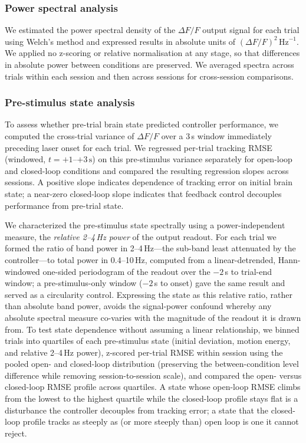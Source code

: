 \subsubsection*{Power spectral analysis}

We estimated the power spectral density of the $\Delta F/F$ output
signal for each trial using Welch's method and expressed results in
absolute units of $(\Delta F/F)^{2}\,\text{Hz}^{-1}$. We applied no
z-scoring or relative normalisation at any stage, so that differences in
absolute power between conditions are preserved. We averaged spectra
across trials within each session and then across sessions for
cross-session comparisons.

\subsubsection*{Pre-stimulus state analysis}
\label{sec:disturbance}

To assess whether pre-trial brain state predicted controller performance,
we computed the cross-trial variance of $\Delta F/F$ over a 3\,s window
immediately preceding laser onset for each trial. We regressed per-trial
tracking RMSE (windowed, $t = +1$--$+3\,\text{s}$) on this pre-stimulus
variance separately for open-loop and closed-loop conditions and compared
the resulting regression slopes across sessions. A positive slope
indicates dependence of tracking error on initial brain state; a
near-zero closed-loop slope indicates that feedback control decouples
performance from pre-trial state.

We characterized the pre-stimulus state spectrally using a
power-independent measure, the \emph{relative 2--4\,Hz power} of the output
readout. For each trial we formed the ratio of band power in 2--4\,Hz---the
sub-band least attenuated by the controller---to total power in
0.4--10\,Hz, computed from a linear-detrended, Hann-windowed one-sided
periodogram of the readout over the $-2$\,s to trial-end window; a
pre-stimulus-only window ($-2$\,s to onset) gave the same result and served
as a circularity control. Expressing the state as this relative ratio,
rather than absolute band power, avoids the signal-power confound whereby
any absolute spectral measure co-varies with the magnitude of the readout
it is drawn from. To test state dependence without assuming a linear
relationship, we binned trials into quartiles of each pre-stimulus state
(initial deviation, motion energy, and relative 2--4\,Hz power), z-scored
per-trial RMSE within session using the pooled open- and closed-loop
distribution (preserving the between-condition level difference while
removing session-to-session scale), and compared the open- versus
closed-loop RMSE profile across quartiles. A state whose open-loop RMSE
climbs from the lowest to the highest quartile while the closed-loop
profile stays flat is a disturbance the controller decouples from tracking
error; a state that the closed-loop profile tracks as steeply as (or more
steeply than) open loop is one it cannot reject.

